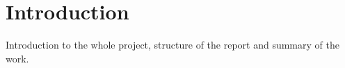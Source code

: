 \section{Introduction}
Introduction to the whole project, structure of the report and summary of
the work.
